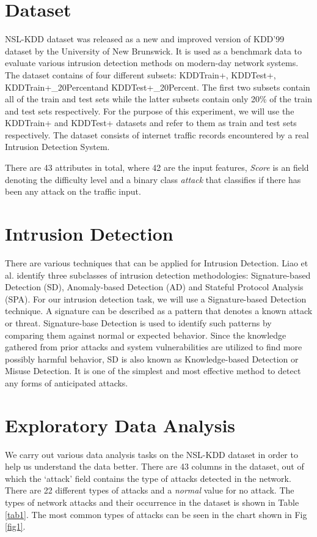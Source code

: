 \documentclass[conference]{IEEEtran}
\begin{document}
\section{Dataset}
NSL-KDD dataset was released as a new and improved version of KDD'99 dataset by the University of New Brunswick. It is used as a benchmark data to evaluate various intrusion detection methods on modern-day network systems.
The dataset contains of four different subsets: KDDTrain+, KDDTest+, KDDTrain+\_20Percentand KDDTest+\_20Percent. The first two subsets contain all of the train and test sets while the latter subsets contain only 20\% of the train and test sets respectively.
For the purpose of this experiment, we will use the KDDTrain+ and KDDTest+ datasets and refer to them as train and test sets respectively.
The dataset consists of internet traffic records encountered by a real Intrusion Detection System.

There are 43 attributes in total, where 42 are the input features, \emph{Score} is an field denoting the difficulty level and a binary class \emph{attack} that classifies if there has been any attack on the traffic input.

\section{Intrusion Detection}
There are various techniques that can be applied for Intrusion Detection. Liao et al. \cite{b2} identify three subclasses of intrusion detection methodologies: Signature-based Detection (SD), Anomaly-based Detection (AD) and Stateful Protocol Analysis (SPA). For our intrusion detection task, we will use a Signature-based Detection technique. A signature can be described as a pattern that denotes a known attack or threat. Signature-base Detection is used to identify such patterns by comparing them against normal or expected behavior. Since the knowledge gathered from prior attacks and system vulnerabilities are utilized to find more possibly harmful behavior, SD is also known as Knowledge-based Detection or Misuse Detection. It is one of the simplest and most effective method to detect any forms of anticipated attacks.

\section{Exploratory Data Analysis}
We carry out various data analysis tasks on the NSL-KDD dataset in order to help us understand the data better. There are 43 columns in the dataset, out of which the `attack' field contains the type of attacks detected in the network. There are 22 different types of attacks and a \emph{normal} value for no attack. The types of network attacks and their occurrence in the dataset is shown in Table \ref{tab1}. The most common types of attacks can be seen in the chart shown in Fig \ref{fig1}.
\end{document}
